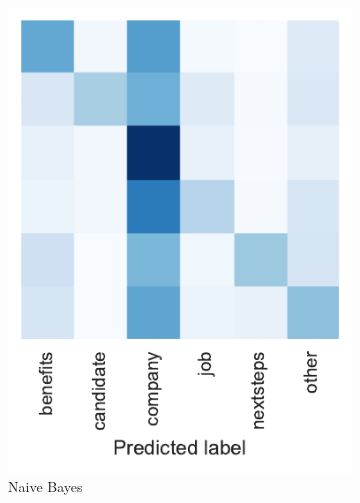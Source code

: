 \begin{figure}[h]
\begin{subfigure}[b]{0.32\textwidth}
        \includegraphics[width=\textwidth]{img/exp-vector-space/bom-conf-matrix-naivebayes-normalized.pdf}
        \caption{Naive Bayes}
\label{fig:bom-conf-matrix-naivebayes-normalized}
    \end{subfigure}
    \begin{subfigure}[b]{0.32\textwidth}

\end{subfigure}
\end{figure}
